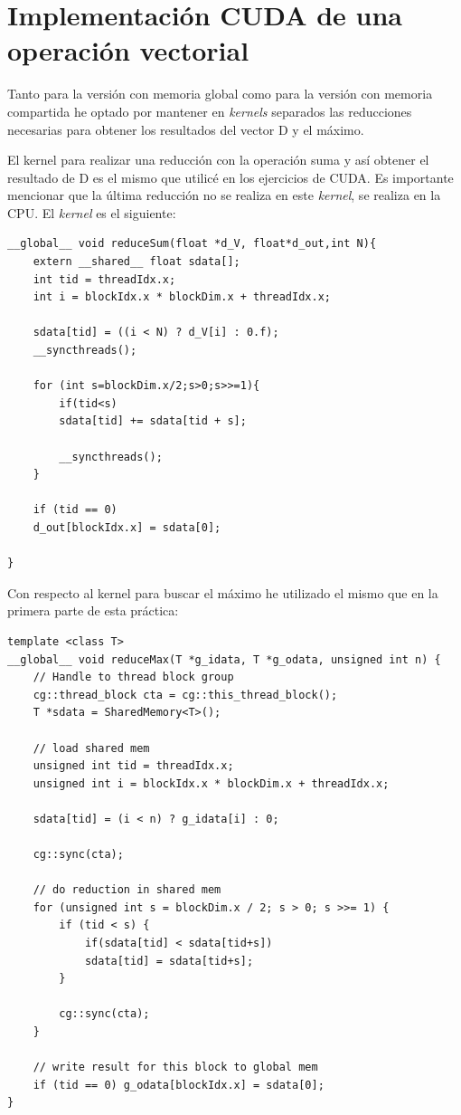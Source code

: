 \section{Implementación CUDA de una operación vectorial}
Tanto para la versión con memoria global como para la versión con memoria compartida he optado por mantener en \textit{kernels} separados las reducciones necesarias para obtener los resultados del vector D y el máximo.

El kernel para realizar una reducción con la operación suma y así obtener el resultado de D es el mismo que utilicé en los ejercicios de CUDA. Es importante mencionar que la última reducción no se realiza en este \textit{kernel}, se realiza en la CPU. El \textit{kernel} es el siguiente: 
\begin{verbatim}
__global__ void reduceSum(float *d_V, float*d_out,int N){
	extern __shared__ float sdata[];
	int tid = threadIdx.x;
	int i = blockIdx.x * blockDim.x + threadIdx.x;
	
	sdata[tid] = ((i < N) ? d_V[i] : 0.f);
	__syncthreads();
	
	for (int s=blockDim.x/2;s>0;s>>=1){
		if(tid<s)
		sdata[tid] += sdata[tid + s];
		
		__syncthreads();
	}
	
	if (tid == 0)
	d_out[blockIdx.x] = sdata[0];
	
}
\end{verbatim}

Con respecto al kernel para buscar el máximo he utilizado el mismo que en la primera parte de esta práctica: 

\begin{verbatim}
template <class T>
__global__ void reduceMax(T *g_idata, T *g_odata, unsigned int n) {
	// Handle to thread block group
	cg::thread_block cta = cg::this_thread_block();
	T *sdata = SharedMemory<T>();
	
	// load shared mem
	unsigned int tid = threadIdx.x;
	unsigned int i = blockIdx.x * blockDim.x + threadIdx.x;
	
	sdata[tid] = (i < n) ? g_idata[i] : 0;
	
	cg::sync(cta);
	
	// do reduction in shared mem
	for (unsigned int s = blockDim.x / 2; s > 0; s >>= 1) {
		if (tid < s) {
			if(sdata[tid] < sdata[tid+s])
			sdata[tid] = sdata[tid+s];
		}
		
		cg::sync(cta);
	}
	
	// write result for this block to global mem
	if (tid == 0) g_odata[blockIdx.x] = sdata[0];
}
\end{verbatim}

